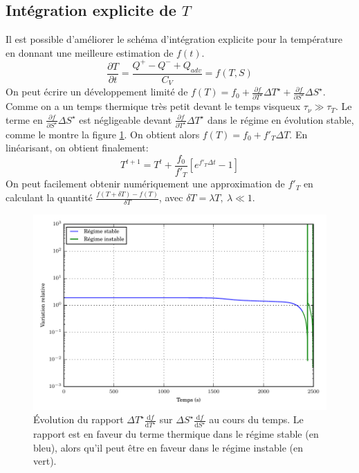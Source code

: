 \subsection{Intégration explicite de $T$}
\label{ssec:integration_T}
Il est possible d'améliorer le schéma d'intégration explicite pour la température en donnant une meilleure estimation de $f(t)$.
\begin{equation}
  \frac{\partial T}{\partial t} = \frac{Q^+ - Q^- + Q_{adv}}{C_V} = f(T, S)
\end{equation}
On peut écrire un développement limité de $f(T) = f_0 + \frac{\partial f}{\partial T^\star}\Delta T^\star + \frac{\partial f}{\partial S^\star}\Delta S^\star$. Comme on a un temps thermique très petit devant le temps visqueux $\tau_\nu \gg \tau_T$. Le terme en $\frac{\partial f}{\partial S^\star}\Delta S^\star$ est négligeable devant $\frac{\partial f}{\partial T^\star}\Delta T^\star$ dans le régime en évolution stable, comme le montre la figure \ref{fig:df_dT_and_df_dS}. On obtient alors $f(T) = f_0 + f'_T \Delta T$. En linéarisant, on obtient finalement:
\begin{equation}
  T^{t+1} = T^t + \frac{f_0}{f'_T}\left[e^{f'_T\Delta t} - 1 \right] 
\end{equation}
On peut facilement obtenir numériquement une approximation de $f'_T$ en calculant la quantité $\frac{f(T+\delta T) - f(T)}{\delta T}$, avec $\delta T = \lambda T,\ \lambda \ll 1$.
\begin{figure}
  \includegraphics[]{figures/df_dS_and_df_dT.pdf}
  \caption{\label{fig:df_dT_and_df_dS} Évolution du rapport $\Delta T^\star \frac{\mathrm{d} f}{\mathrm{d} T^\star}$ sur $\Delta S^\star\frac{\mathrm{d} f}{\mathrm{d}S^\star}$ au cours du temps. Le rapport est en faveur du terme thermique dans le régime stable (en bleu), alors qu'il peut être en faveur dans le régime instable (en vert).}
\end{figure}


